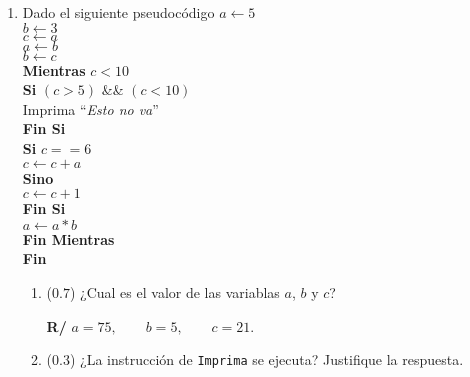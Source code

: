 \documentclass[12pt]{article}
\begin{document}
  \begin{enumerate}[leftmargin=*,widest=9]
    \item Dado el siguiente pseudocódigo
\(a \gets 5 \) \\
\(b \gets 3 \) \\
\(c \gets a \) \\
\(a \gets b \) \\
\(b \gets c \) \\
\textbf{Mientras} \(c < 10 \) \\
\hspace*{1cm}\textbf{Si} \((c > 5)\) \&\& \((c < 10)\) \\
\hspace*{1cm}\hspace*{1cm}Imprima ``\textit{Esto no va}'' \\
\hspace*{1cm}\textbf{Fin Si} \\
\hspace*{1cm}\textbf{Si} \(c == 6\) \\
\hspace*{1cm}\hspace*{1cm}\(c \gets c + a \) \\
\hspace*{1cm}\textbf{Sino} \\
\hspace*{1cm}\hspace*{1cm}\(c \gets c + 1 \) \\
\hspace*{1cm}\textbf{Fin Si}\\
\hspace*{1cm}\(a \gets a * b \) \\
\textbf{Fin Mientras}\\
\textbf{Fin}\\
\vspace{-.5cm}
    \begin{enumerate}[label=\alph*]
    \item (\(0.7\)) ¿Cual es el valor de las variablas \(a\), \(b\) y \(c\)?

\textbf{R/} \(a = 75, \qquad b=5, \qquad c=21. \)
    \item (\(0.3\)) ¿La instrucción de \verb-Imprima- se ejecuta? Justifique la respuesta.


\end{enumerate}
\end{enumerate}
\end{document}
